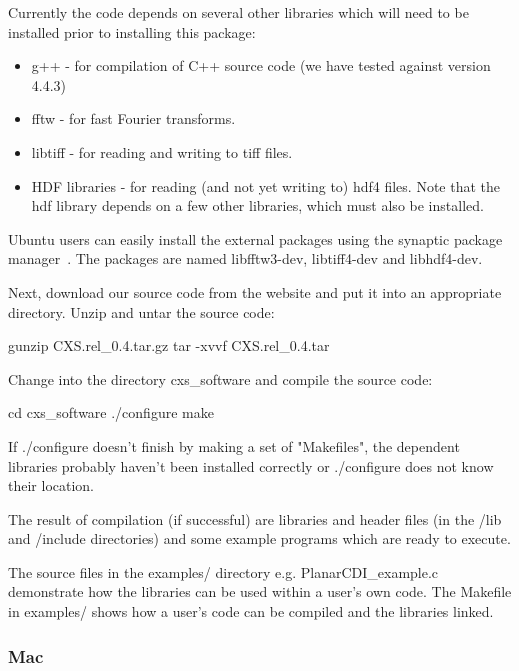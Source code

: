 \documentclass[]{cxs-software}
\begin{document}
Currently the code depends on several other libraries which will need to
be installed prior to installing this package:
\begin{itemize}
\item g++\cite{} - for compilation of C++ source code (we have tested against version 4.4.3)
\item fftw\cite{} - for fast Fourier transforms.
\item libtiff\cite{} - for reading and writing to tiff files.
\item HDF libraries\cite{} - for reading (and not yet writing to) hdf4
  files. Note that the hdf library depends on a few other libraries,
  which must also be installed.
\end{itemize}

Ubuntu users can easily install the external packages using the
synaptic package manager~\cite{}. The packages are named libfftw3-dev,
libtiff4-dev and libhdf4-dev.

Next, download our source code from the website and put it into an
appropriate directory. Unzip and untar the source code:
\begin{myverbatim}
  gunzip CXS.rel_0.4.tar.gz 
  tar -xvvf CXS.rel_0.4.tar
\end{myverbatim}

Change into the directory cxs\_software and compile the source code: 
\begin{myverbatim}
  cd cxs_software 
  ./configure 
  make
\end{myverbatim}

If ./configure doesn't finish by making a set of "Makefiles", the
dependent libraries probably haven't been installed correctly or
./configure does not know their location.

The result of compilation (if successful) are libraries and header
files (in the /lib and /include directories) and some example programs
which are ready to execute.

The source files in the examples/ directory e.g. PlanarCDI\_example.c
demonstrate how the libraries can be used within a user's own
code. The Makefile in examples/ shows how a user's code can be
compiled and the \name libraries linked.

\subsubsection{Mac}
\end{document}
